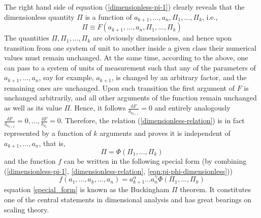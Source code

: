 The right hand side of equation (\ref{dimensionless-pi-1}) clearly reveals that the dimensionless quantity $\Pi$ is a function of $a_{k+1},\ldots,a_n,\Pi_1,\ldots,\Pi_k$, i.e.,
\begin{equation}
	\Pi \equiv F(a_{k+1}, \ldots, a_n, \Pi_1,\ldots,\Pi_k)
	\label{dimensionless-relation}
\end{equation}
The quantities $\Pi, \Pi_1,\ldots, \Pi_k$ are obviously dimensionless, and hence upon transition from one system of unit to another inside a given class their numerical values must remain unchanged. At the same time, according to the above, one can pass to a system of units of measurement such that any of the parameters of $a_{k+1}, \ldots, a_n$, say for example, $a_{k+1}$, is changed by an arbitrary factor, and the remaining ones are unchanged. Upon such transition the first argument of $F$ is unchanged arbitrarily, and all other arguments of the function remain unchanged as well as its value $\Pi$. Hence, it follows $\frac{\delta F}{\delta_{a_{k+1}}} = 0$ and entirely analogously $\frac{\delta F}{\delta_{a_{k+2}}} = 0, \ldots , \frac{\delta F}{\delta_{a_n}}=0$. Therefore, the relation (\ref{dimensionless-relation}) is in fact represented by a function of $k$ arguments and proves it is independent of $a_{k+1}, \ldots, a_n$, that is,
\begin{equation}
	\Pi = \Phi(\Pi_1, \ldots, \Pi_k)
	\label{eqn:pi-phi-dimensionless}
\end{equation}
and the function $f$ can be written in the following special form (by combining (\ref{dimensionless-pi-1}, \ref{dimensionless-relation}, \ref{eqn:pi-phi-dimensionless}))
\begin{equation}
f(a_1,\ldots,a_k,\ldots,a_n) = a^{\alpha}_{k+1} \ldots a^{\gamma}_n \Phi(\Pi_1, \ldots, \Pi_k)
\label{special_form}
\end{equation}
equation \ref{special_form} is known as the Buckingham $\Pi$ theorem. It constitutes one of the central statements in dimensional analysis and has great bearings on scaling theory. 
